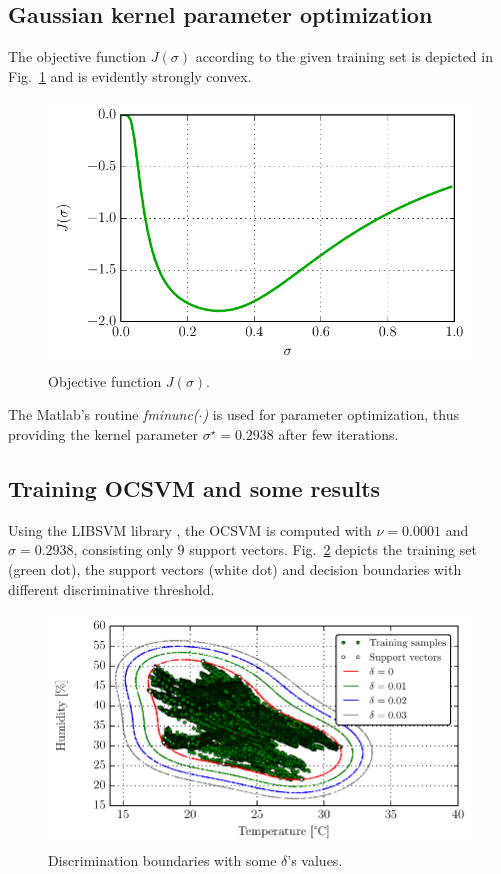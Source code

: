 \documentclass[conference]{IEEEtran}
\begin{document}
\subsection{Gaussian kernel parameter optimization}

The objective function $J(\sigma)$ according to the given training set is depicted in Fig.~\ref{fig:cost_fcn} and is evidently strongly convex.
\begin{figure}[H]
\centering
\includegraphics[scale=.6]{Python/cost_fcn.pdf}
\caption{Objective function $J(\sigma)$. }
\label{fig:cost_fcn}
\end{figure}

The Matlab's routine \emph{fminunc($\cdot$)} is used for parameter optimization, thus providing the kernel parameter $\sigma^\star=0.2938$ after few iterations.

\subsection{Training OCSVM and some results}

Using the LIBSVM library \cite{chang2011}, the OCSVM is computed with $\nu=0.0001$ and $\sigma=0.2938$, consisting only $9$ support vectors. Fig.~\ref{fig:domain_boundary} depicts the training set (green dot), the support vectors (white dot) and decision boundaries with different discriminative threshold. 
\begin{figure}[H]
\centering
\includegraphics[scale=.6]{Python/data_description.pdf}
\caption{Discrimination boundaries with some $\delta$'s values. }
\label{fig:domain_boundary}
\end{figure}
\end{document}
